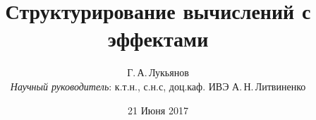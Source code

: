 

\usepackage[cache=false]{minted}
\usepackage{pgf}
\usepackage{tikz}

\title[Структурирование вычислений с эффектами]{Структурирование вычислений с эффектами}

\subtitle{}




\author[Г.\,А.\,Лукьянов]
{%
  {Г.\,А.\,Лукьянов \\
  \scriptsize{\emph{Научный руководитель}: к.т.н., с.н.с, доц.каф. ИВЭ А.\,Н.\,Литвиненко}}
}

\date{21 Июня 2017}%




\begin{frame}
\titlepage
\end{frame}


